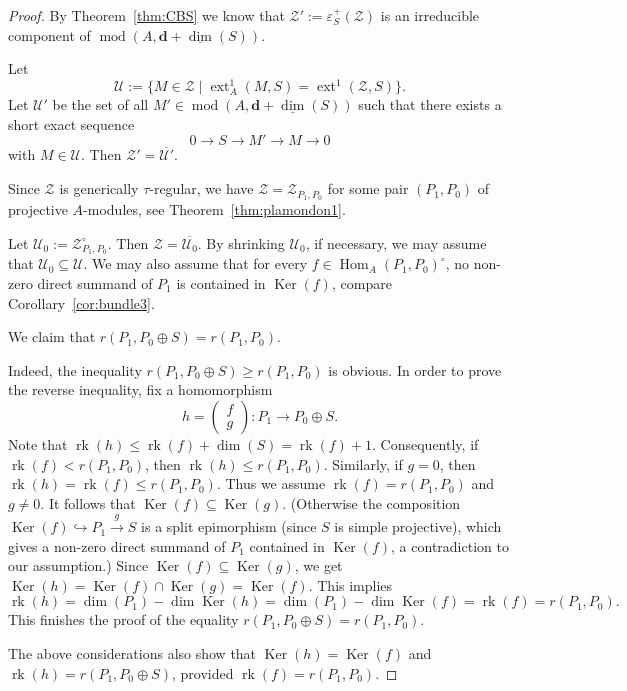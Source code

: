 \documentclass[12pt,reqno]{amsart}
\theoremstyle{definition}
\newcommand{\cU}{{\mathcal U}}
\newcommand{\bd}{\mathbf{d}}
\newcommand{\rk}{\operatorname{rk}}
\newcommand{\md}{\operatorname{mod}}
\newcommand{\dimv}{\underline{\dim}}
\newcommand{\Hom}{\operatorname{Hom}}
\newcommand{\ext}{\operatorname{ext}}
\newcommand{\Ker}{\operatorname{Ker}}
\newcommand{\bbm}{\begin{matrix}}
\newcommand{\ebm}{\end{matrix}}
\newcommand{\calU}{\mathcal{U}}
\newcommand{\calZ}{\mathcal{Z}}
\begin{document}
\begin{proof}
By Theorem~\ref{thm:CBS} we know that
$\calZ' := \varepsilon_S^+(\calZ)$ is an irreducible component of $\md(A,\bd + \dimv(S))$.

Let
\[
\calU := \{ M \in \calZ \mid \ext_A^1(M,S) = \ext^1(\calZ,S) \}.
\]
Let $\calU'$ be the set of all $M' \in \md(A,\bd + \dimv(S))$ such that
there exists a short exact sequence
$$
0 \to S \to M' \to M \to 0
$$
with $M \in \calU$.
Then $\calZ' = \overline{\calU'}$.

Since $\calZ$ is generically $\tau$-regular,
we have $\calZ = \calZ_{P_1,P_0}$ for some pair $(P_1,P_0)$
of projective $A$-modules, see Theorem~\ref{thm:plamondon1}.


Let $\cU_0 := \calZ_{P_1,P_0}^\circ$.
Then $\calZ = \overline{\cU_0}$.
By shrinking $\calU_0$, if necessary, we may assume that $\calU_0 \subseteq \calU$.
We may also assume that
for every
$f \in \Hom_A(P_1,P_0)^\circ$,
no non-zero direct summand of $P_1$ is contained in $\Ker(f)$,
compare Corollary~\ref{cor:bundle3}.

We claim that $r(P_1,P_0 \oplus S) = r(P_1,P_0)$.

Indeed, the inequality $r(P_1,P_0 \oplus S) \geq r(P_1,P_0)$ is obvious.
In order to prove the reverse inequality, fix a homomorphism
$$
h =
\left(\bbm
f \\ g
\ebm\right)
\colon P_1 \to P_0 \oplus S.
$$
Note that
$\rk(h) \leq \rk(f) + \dim(S) = \rk(f) + 1$.
Consequently, if $\rk(f )< r(P_1,P_0)$, then
$\rk(h) \leq r(P_1,P_0)$.
Similarly,
if $g = 0$, then
$\rk(h)=\rk(f)\leq r(P_1,P_0)$.
Thus we assume $\rk(f) = r(P_1,P_0)$ and $g \neq 0$.
It follows that $\Ker(f) \subseteq \Ker(g)$.
(Otherwise the composition $\Ker(f) \hookrightarrow P_1 \xrightarrow{g} S$ is a split epimorphism (since $S$ is simple projective), which gives a
non-zero direct summand of $P_1$ contained in $\Ker(f)$, a contradiction to our assumption.)
Since $\Ker(f) \subseteq \Ker(g)$, we get $\Ker(h) = \Ker(f) \cap \Ker(g) = \Ker(f)$.
This implies
$$
\rk(h) = \dim(P_1) - \dim \Ker(h)
= \dim(P_1) - \dim \Ker(f) = \rk(f) = r(P_1,P_0).
$$
This finishes the proof of the equality
$r(P_1,P_0 \oplus S) = r(P_1,P_0)$.

The above considerations also show that
$\Ker(h) = \Ker(f)$ and
$\rk(h) = r(P_1,P_0 \oplus S)$, provided
$\rk(f) = r(P_1,P_0)$.


\end{proof}
\end{document}
